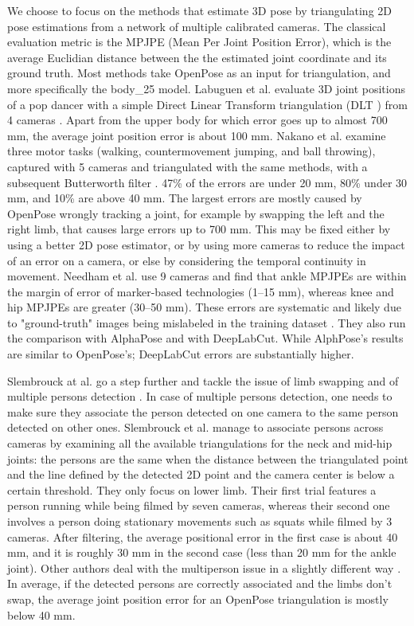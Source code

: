 We choose to focus on the methods that estimate 3D pose by triangulating 2D pose estimations from a network of multiple calibrated cameras. The classical evaluation metric is the MPJPE (Mean Per Joint Position Error), which is the average Euclidian distance between the  the estimated joint coordinate and its ground truth. Most methods take OpenPose as an input for triangulation, and more specifically the body\_25 model. Labuguen et al. evaluate 3D joint positions of a pop dancer with a simple Direct Linear Transform triangulation (DLT \cite{Hartley1997,Miller1980}) from 4 cameras \cite{Labuguen2020}. Apart from the upper body for which error goes up to almost 700 mm, the average joint position error is about 100 mm. Nakano et al. examine three motor tasks (walking, countermovement jumping, and ball throwing), captured with 5 cameras and triangulated with the same methods, with a subsequent Butterworth filter \cite{Nakano2019}. 47\% of the errors are under 20 mm, 80\% under 30 mm, and 10\% are above 40 mm. The largest errors are mostly caused by OpenPose wrongly tracking a joint, for example by swapping the left and the right limb, that causes large errors up to 700 mm. This may be fixed either by using a better 2D pose estimator, or by using more cameras to reduce the impact of an error on a camera, or else by considering the temporal continuity in movement. Needham et al. use 9 cameras and find that ankle MPJPEs are within the margin of error of marker-based technologies (1–15 mm), whereas knee and hip MPJPEs are greater (30–50 mm). These errors are systematic and likely due to "ground-truth" images being mislabeled in the training dataset \cite{Needham2021}. They also run the comparison with AlphaPose and with DeepLabCut. While AlphPose's results are similar to OpenPose’s; DeepLabCut errors are substantially higher.

Slembrouck at al. go a step further and tackle the issue of limb swapping and of multiple persons detection \cite{Slembrouck2020}. In case of multiple persons detection, one needs to make sure they associate the person detected on one camera to the same person detected on other ones. Slembrouck et al. manage to associate persons across cameras by examining all the available triangulations for the neck and mid-hip joints: the persons are the same when the distance between the triangulated point and the line defined by the detected 2D point and the camera center is below a certain threshold. They only focus on lower limb. Their first trial features a person running while being filmed by seven cameras, whereas their second one involves a person doing stationary movements such as squats while filmed by 3 cameras. After filtering, the average positional error in the first case is about 40 mm, and it is roughly 30 mm in the second case (less than 20 mm for the ankle joint). Other authors deal with the multiperson issue in a slightly different way \cite{Bridgeman2019,Chu2021,Dong2019}. In average, if the detected persons are correctly associated and the limbs don’t swap, the average joint position error for an OpenPose triangulation is mostly below 40 mm.

